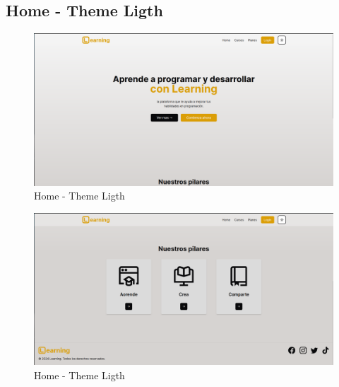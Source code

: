 \subsection{Home - Theme Ligth}
  \begin{figure}[H]
    \centering
    \includegraphics[width=1.0\textwidth]{img/H-L.png}
    \caption{Home - Theme Ligth}
  \end{figure}
  \begin{figure}[H]
    \centering
    \includegraphics[width=1.0\textwidth]{img/H-L2.png}
    \caption{Home - Theme Ligth}
  \end{figure}
